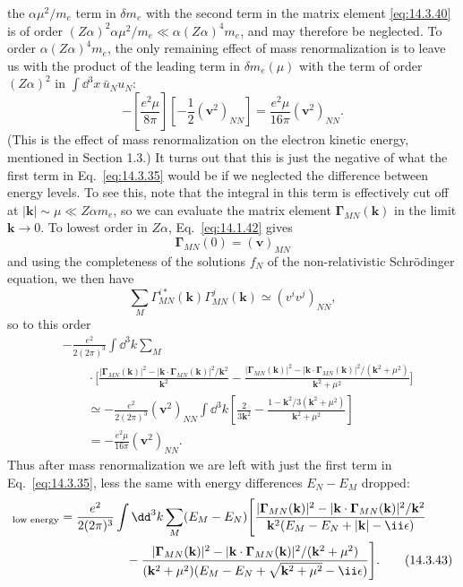 the $\alpha\mu^2/m_e$ term in $\delta m_e$ with the second term in the matrix
element \eqref{eq:14.3.40} is of order
$(Z\alpha)^2\alpha\mu^2/m_e\ll\alpha(Z\alpha)^4m_e$, and may therefore be
neglected. To order $\alpha(Z\alpha)^4m_e$, the only remaining effect of mass
renormalization is to leave us with the product of the leading term in
$\delta m_e(\mu)$ with the term of order $(Z\alpha)^2$ in
$\int \dd^3x\,\bar u_Nu_N$:
\[
-\left[\frac{e^2\mu}{8\pi}\right]
\left[-\frac12(\mathbf v^2)_{NN}\right]
=\frac{e^2\mu}{16\pi}(\mathbf v^2)_{NN}.
\]
(This is the effect of mass renormalization on the electron kinetic energy,
mentioned in Section 1.3.) It turns out that this is just the negative of what
the first term in Eq.~\eqref{eq:14.3.35} would be if we neglected the
difference between energy levels. To see this, note that the integral in this
term is effectively cut off at $|\mathbf k|\sim\mu\ll Z\alpha m_e$, so we can
evaluate the matrix element $\boldsymbol\Gamma_{MN}(\mathbf k)$ in the limit
$\mathbf k\to0$. To lowest order in $Z\alpha$, Eq.~\eqref{eq:14.1.42} gives
\begin{equation}
\boldsymbol\Gamma_{MN}(0)=(\mathbf v)_{MN}
\tag{14.3.41}\label{eq:14.3.41}
\end{equation}
and using the completeness of the solutions $f_N$ of the non-relativistic
Schrödinger equation, we then have
\begin{equation}
\sum_M\Gamma_{MN}^{i*}(\mathbf k)\Gamma_{MN}^j(\mathbf k)
\simeq(v^iv^j)_{NN},
\tag{14.3.42}\label{eq:14.3.42}
\end{equation}
so to this order
\begin{align*}
&-\frac{e^2}{2(2\pi)^3}\int \dd^3k\sum_M\\
&\qquad\cdot\Biggl[
\frac{|\boldsymbol\Gamma_{MN}(\mathbf k)|^2
-|\mathbf k\cdot\boldsymbol\Gamma_{MN}(\mathbf k)|^2/\mathbf k^2}
{\mathbf k^2}
-\frac{|\boldsymbol\Gamma_{MN}(\mathbf k)|^2
-|\mathbf k\cdot\boldsymbol\Gamma_{MN}(\mathbf k)|^2/(\mathbf k^2+\mu^2)}
{\mathbf k^2+\mu^2}\Biggr]\\
&\qquad\simeq-\frac{e^2}{2(2\pi)^3}(\mathbf v^2)_{NN}
\int \dd^3k\left[\frac{2}{3\mathbf k^2}
-\frac{1-\mathbf k^2/3(\mathbf k^2+\mu^2)}{\mathbf k^2+\mu^2}\right]\\
&\qquad=-\frac{e^2\mu}{16\pi}(\mathbf v^2)_{NN}.
\end{align*}
Thus after mass renormalization we are left with just the first term in
Eq.~\eqref{eq:14.3.35}, less the same with energy differences $E_N-E_M$
dropped:
\begin{align}
[\delta E_N]_{\text{low energy}}={}&
\frac{e^2}{2(2\pi)^3}\int \dd^3k\sum_M(E_M-E_N)
\Biggl[\frac{|\boldsymbol\Gamma_{MN}(\mathbf k)|^2
-|\mathbf k\cdot\boldsymbol\Gamma_{MN}(\mathbf k)|^2/\mathbf k^2}
{\mathbf k^2(E_M-E_N+|\mathbf k|-\ii\epsilon)}\notag\\
&\hspace{14mm}-
\frac{|\boldsymbol\Gamma_{MN}(\mathbf k)|^2
-|\mathbf k\cdot\boldsymbol\Gamma_{MN}(\mathbf k)|^2/(\mathbf k^2+\mu^2)}
{(\mathbf k^2+\mu^2)(E_M-E_N+\sqrt{\mathbf k^2+\mu^2}-\ii\epsilon)}
\Biggr].
\tag{14.3.43}\label{eq:14.3.43}
\end{align}
